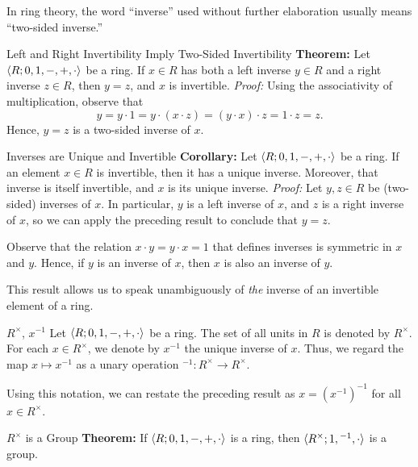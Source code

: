In ring theory, the word ``inverse'' used without further elaboration usually means ``two-sided inverse.''

\begin{thmbox}{Left and Right Invertibility Imply Two-Sided Invertibility}
	\textbf{Theorem:} Let ${\langle {R; 0, 1, -, +, \cdot} \rangle}$ be a ring. If $x \in R$ has both a left inverse $y \in R$ and a right inverse $z \in R$, then $y = z$, and $x$ is invertible.
\tcblower
	\textit{Proof:} Using the associativity of multiplication, observe that
	\[ y = y \cdot 1 = y \cdot (x \cdot z) = (y \cdot x) \cdot z = 1 \cdot z = z. \]
	Hence, $y = z$ is a two-sided inverse of $x$.
\end{thmbox}

\begin{thmbox}{Inverses are Unique and Invertible}
	\textbf{Corollary:} Let ${\langle {R; 0, 1, -, +, \cdot} \rangle}$ be a ring. If an element $x \in R$ is invertible, then it has a unique inverse. Moreover, that inverse is itself invertible, and $x$ is its unique inverse.
\tcblower
	\textit{Proof:} Let $y,z \in R$ be (two-sided) inverses of $x$. In particular, $y$ is a left inverse of $x$, and $z$ is a right inverse of $x$, so we can apply the preceding result to conclude that $y = z$.

	Observe that the relation $x \cdot y = y \cdot x = 1$ that defines inverses is symmetric in $x$ and $y$. Hence, if $y$ is an inverse of $x$, then $x$ is also an inverse of $y$.
\end{thmbox}

This result allows us to speak unambiguously of \textit{the} inverse of an invertible element of a ring.

\begin{dfnbox}{$R^\times$, $x^{-1}$}
	Let ${\langle {R; 0, 1, -, +, \cdot} \rangle}$ be a ring. The set of all units in $R$ is denoted by $R^\times$. For each $x \in R^\times$, we denote by $x^{-1}$ the unique inverse of $x$. Thus, we regard the map $x \mapsto x^{-1}$ as a unary operation ${}^{-1}: R^\times \to R^\times$.
\end{dfnbox}

Using this notation, we can restate the preceding result as $x = (x^{-1})^{-1}$ for all $x \in R^\times$.

\begin{thmbox}{$R^\times$ is a Group}
	\textbf{Theorem:} If ${\langle {R; 0, 1, -, +, \cdot} \rangle}$ is a ring, then ${\langle {R^\times; 1, {}^{-1}, \cdot} \rangle}$ is a group.
\end{thmbox}

